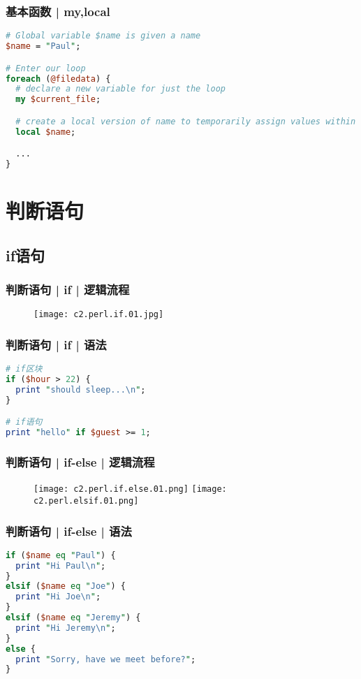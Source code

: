 \begin{frame}[fragile]
  \frametitle{基本函数 | \alert{my},local}
\begin{lstlisting}[language=Perl]
# Global variable $name is given a name
$name = "Paul";

# Enter our loop
foreach (@filedata) {
  # declare a new variable for just the loop
  my $current_file;

  # create a local version of name to temporarily assign values within the loop to
  local $name;

  ...
}
\end{lstlisting}
\end{frame}

\section{判断语句}
\subsection{if语句}
\begin{frame}
  \frametitle{判断语句 | if | 逻辑流程}
  \begin{figure}
    \centering
    \texttt{[image: c2.perl.if.01.jpg]}
  \end{figure}
\end{frame}

\begin{frame}[fragile]
  \frametitle{判断语句 | if | \alert{语法}}
\begin{lstlisting}[language=Perl]
# if区块
if ($hour > 22) {
  print "should sleep...\n";
}

# if语句
print "hello" if $guest >= 1;
\end{lstlisting}
\end{frame}

\begin{frame}
  \frametitle{判断语句 | if-else | 逻辑流程}
  \begin{figure}
    \centering
    \texttt{[image: c2.perl.if.else.01.png]}
    \texttt{[image: c2.perl.elsif.01.png]}
  \end{figure}
\end{frame}

\begin{frame}[fragile]
  \frametitle{判断语句 | if-else | \alert{语法}}
\begin{lstlisting}[language=Perl]
if ($name eq "Paul") {
  print "Hi Paul\n";
}
elsif ($name eq "Joe") {
  print "Hi Joe\n";
}
elsif ($name eq "Jeremy") {
  print "Hi Jeremy\n";
}
else {
  print "Sorry, have we meet before?";
}
\end{lstlisting}
\end{frame}


